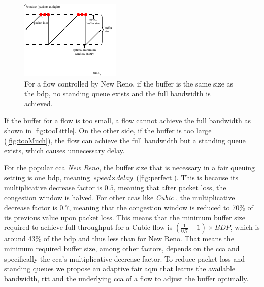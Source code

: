\documentclass[conference]{IEEEtran}
\begin{document}
\begin{figure}[h]
\includegraphics[width=\columnwidth]{figures/cocoa_illustration_perfect.pdf}
\caption{For a flow controlled by New Reno, if the buffer is the same size as the \gls{bdp}, no standing queue exists and the full bandwidth is achieved.}
\label{fig:perfect}
\end{figure}

If the buffer for a flow is too small, a flow cannot achieve the full bandwidth as shown in \autoref{fig:tooLittle}. On the other side, if the buffer is too large (\autoref{fig:tooMuch}), the flow can achieve the full bandwidth but a standing queue exists, which causes unnecessary delay.  

For the popular \gls{cca} \textit{New Reno}, the buffer size that is necessary in a fair queuing setting is one \gls{bdp}, meaning $\textit{speed}\times\textit{delay}$ (\autoref{fig:perfect}). This is because its multiplicative decrease factor is $0.5$, meaning that after packet loss, the congestion window is halved. For other \glspl{cca} like \textit{Cubic} \cite{ha_cubic:_2008}, the multiplicative decrease factor is $0.7$, meaning that the congestion window is reduced to 70\% of its previous value upon packet loss. This means that the minimum buffer size required to achieve full throughput for a Cubic flow is $\left(\frac{1}{0.7}-1\right)\times \textit{BDP}$, which is around 43\% of the \gls{bdp} and thus less than for New Reno. That means the minimum required buffer size, among other factors, depends on the \gls{cca} and specifically the \gls{cca}'s multiplicative decrease factor. To reduce packet loss and standing queues we propose an adaptive fair \gls{aqm} that learns the available bandwidth, \gls{rtt} and the underlying \gls{cca} of a flow to adjust the buffer optimally. 
\end{document}
